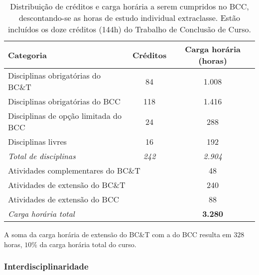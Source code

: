 \begin{table}[h!]
    \centering
    \caption{Distribuição de créditos e carga horária a serem cumpridos no BCC,
      descontando-se as horas de estudo individual extraclasse. Estão incluídos os
    doze créditos (144h) do Trabalho de Conclusão de Curso.}
    \label{tab:carga_horaria}
    \begin{tabular}{|l|c|c|}
        \hline
        \textbf{Categoria}                        & \textbf{Créditos} & \textbf{Carga horária (horas)} \\
        \hline\hline
        Disciplinas obrigatórias do BC\&T         & 84                & 1.008 \\
        \hline
        Disciplinas obrigatórias do BCC           & 118               & 1.416 \\
        \hline
        Disciplinas de opção limitada do BCC      & 24                & 288 \\
        \hline
        Disciplinas livres                        & 16                 & 192 \\
        \hline
        \textit{Total de disciplinas}             & \textit{242}       & \textit{2.904}\\
        \hline\hline
        \multicolumn{2}{|l|}{Atividades complementares do BC\&T}       & 48 \\
        \hline
        \multicolumn{2}{|l|}{Atividades de extensão do BC\&T}          & 240 \\
        \hline
        \multicolumn{2}{|l|}{Atividades de extensão do BCC}            & 88 \\
      \hline
        \multicolumn{2}{|l|}{\textit{Carga horária total}}               & \textbf{3.280}\\
        \hline
    \end{tabular}
\end{table}
A soma da carga horária de extensão do BC\&T com a do BCC resulta em $328$ horas, $10\%$
da carga horária total do curso.

\subsubsection{Interdisciplinaridade}

